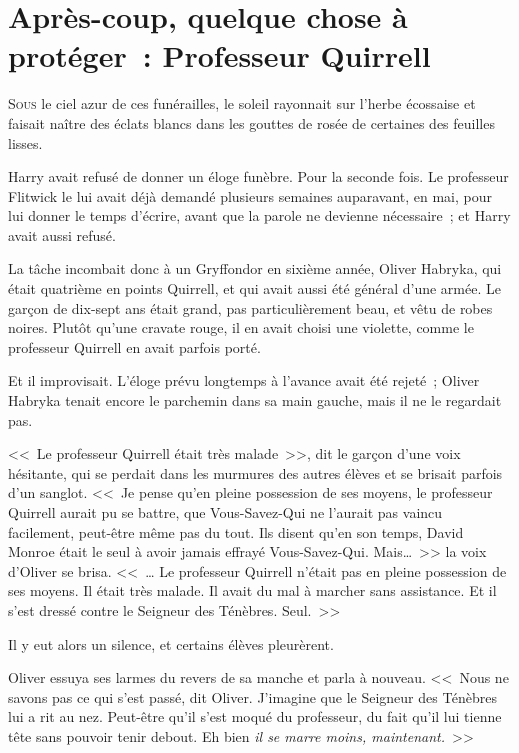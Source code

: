\chapter{Après-coup, quelque chose à protéger~: Professeur Quirrell}

\lettrine{S}{ous} le ciel azur de ces funérailles, le soleil rayonnait sur l'herbe écossaise et faisait naître des éclats blancs dans les gouttes de rosée de certaines des feuilles lisses.

Harry avait refusé de donner un éloge funèbre. Pour la seconde fois. Le professeur Flitwick le lui avait déjà demandé plusieurs semaines auparavant, en mai, pour lui donner le temps d'écrire, avant que la parole ne devienne nécessaire~; et Harry avait aussi refusé.

La tâche incombait donc à un Gryffondor en sixième année, Oliver Habryka, qui était quatrième en points Quirrell, et qui avait aussi été général d'une armée. Le garçon de dix-sept ans était grand, pas particulièrement beau, et vêtu de robes noires. Plutôt qu'une cravate rouge, il en avait choisi une violette, comme le professeur Quirrell en avait parfois porté.

Et il improvisait. L'éloge prévu longtemps à l'avance avait été rejeté~; Oliver Habryka tenait encore le parchemin dans sa main gauche, mais il ne le regardait pas.

<<~Le professeur Quirrell était très malade~>>, dit le garçon d'une voix hésitante, qui se perdait dans les murmures des autres élèves et se brisait parfois d'un sanglot. <<~Je pense qu'en pleine possession de ses moyens, le professeur Quirrell aurait pu se battre, que Vous-Savez-Qui ne l'aurait pas vaincu facilement, peut-être même pas du tout. Ils disent qu'en son temps, David Monroe était le seul à avoir jamais effrayé Vous-Savez-Qui. Mais…~>> la voix d'Oliver se brisa. <<~… Le professeur Quirrell n'était pas en pleine possession de ses moyens. Il était très malade. Il avait du mal à marcher sans assistance. Et il s'est dressé contre le Seigneur des Ténèbres. Seul.~>>

Il y eut alors un silence, et certains élèves pleurèrent.

Oliver essuya ses larmes du revers de sa manche et parla à nouveau. <<~Nous ne savons pas ce qui s'est passé, dit Oliver. J'imagine que le Seigneur des Ténèbres lui a rit au nez. Peut-être qu'il s'est moqué du professeur, du fait qu'il lui tienne tête sans pouvoir tenir debout. Eh bien \emph{il se marre moins, maintenant.}~>>

